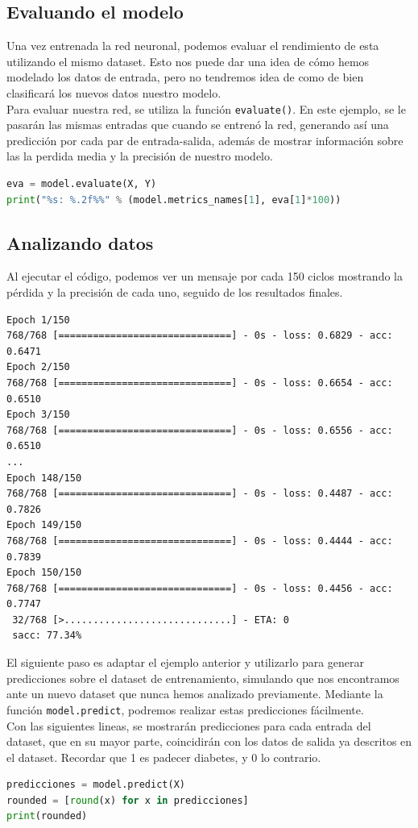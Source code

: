 \subsection{Evaluando el modelo}
Una vez entrenada la red neuronal, podemos evaluar el rendimiento de esta utilizando el mismo dataset. Esto nos puede dar una idea de cómo hemos modelado los datos de entrada, pero no tendremos idea de como de bien clasificará los nuevos datos nuestro modelo.\\
Para evaluar nuestra red, se utiliza la función \lstinline{evaluate()}. En este ejemplo, se le pasarán las mismas entradas que cuando se entrenó la red, generando así una predicción por cada par de entrada-salida, además de mostrar información sobre las la perdida media y la precisión de nuestro modelo.
\begin{lstlisting}[language=Python]
eva = model.evaluate(X, Y)
print("%s: %.2f%%" % (model.metrics_names[1], eva[1]*100))
\end{lstlisting}

\subsection{Analizando datos}
Al ejecutar el código, podemos ver un mensaje por cada 150 ciclos mostrando la pérdida y la precisión de cada uno, seguido de los resultados finales.
\begin{lstlisting}
Epoch 1/150
768/768 [==============================] - 0s - loss: 0.6829 - acc: 0.6471
Epoch 2/150
768/768 [==============================] - 0s - loss: 0.6654 - acc: 0.6510
Epoch 3/150
768/768 [==============================] - 0s - loss: 0.6556 - acc: 0.6510
...
Epoch 148/150
768/768 [==============================] - 0s - loss: 0.4487 - acc: 0.7826
Epoch 149/150
768/768 [==============================] - 0s - loss: 0.4444 - acc: 0.7839
Epoch 150/150
768/768 [==============================] - 0s - loss: 0.4456 - acc: 0.7747
 32/768 [>.............................] - ETA: 0
 sacc: 77.34%
\end{lstlisting}
El siguiente paso es adaptar el ejemplo anterior y utilizarlo para generar predicciones sobre el dataset de entrenamiento, simulando que nos encontramos ante un nuevo dataset que nunca hemos analizado previamente. Mediante la función \lstinline{model.predict}, podremos realizar estas predicciones fácilmente.\\
Con las siguientes lineas, se mostrarán predicciones para cada entrada del dataset, que en su mayor parte, coincidirán con los datos de salida ya descritos en el dataset. Recordar que 1 es padecer diabetes, y 0 lo contrario.
\begin{lstlisting}[language=Python]
predicciones = model.predict(X)
rounded = [round(x) for x in predicciones]
print(rounded)
\end{lstlisting}

